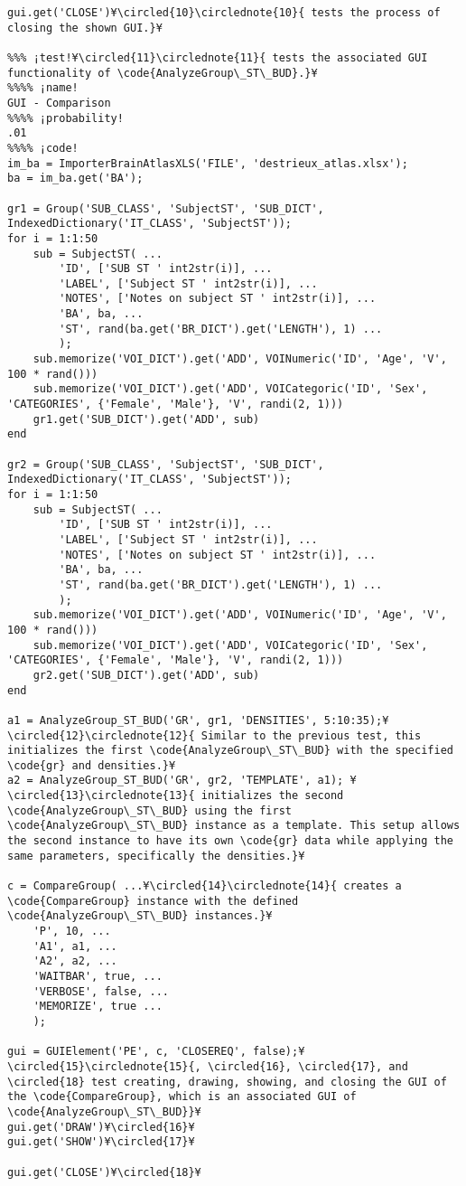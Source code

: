 \documentclass{tufte-handout}
\begin{document}
\begin{lstlisting}
gui.get('CLOSE')¥\circled{10}\circlednote{10}{ tests the process of closing the shown GUI.}¥

%%% ¡test!¥\circled{11}\circlednote{11}{ tests the associated GUI functionality of \code{AnalyzeGroup\_ST\_BUD}.}¥
%%%% ¡name!
GUI - Comparison
%%%% ¡probability!
.01
%%%% ¡code!
im_ba = ImporterBrainAtlasXLS('FILE', 'destrieux_atlas.xlsx');
ba = im_ba.get('BA');

gr1 = Group('SUB_CLASS', 'SubjectST', 'SUB_DICT', IndexedDictionary('IT_CLASS', 'SubjectST'));
for i = 1:1:50
    sub = SubjectST( ...
        'ID', ['SUB ST ' int2str(i)], ...
        'LABEL', ['Subject ST ' int2str(i)], ...
        'NOTES', ['Notes on subject ST ' int2str(i)], ...
        'BA', ba, ...
        'ST', rand(ba.get('BR_DICT').get('LENGTH'), 1) ...
        );
    sub.memorize('VOI_DICT').get('ADD', VOINumeric('ID', 'Age', 'V', 100 * rand()))
    sub.memorize('VOI_DICT').get('ADD', VOICategoric('ID', 'Sex', 'CATEGORIES', {'Female', 'Male'}, 'V', randi(2, 1)))
    gr1.get('SUB_DICT').get('ADD', sub)
end

gr2 = Group('SUB_CLASS', 'SubjectST', 'SUB_DICT', IndexedDictionary('IT_CLASS', 'SubjectST'));
for i = 1:1:50
    sub = SubjectST( ...
        'ID', ['SUB ST ' int2str(i)], ...
        'LABEL', ['Subject ST ' int2str(i)], ...
        'NOTES', ['Notes on subject ST ' int2str(i)], ...
        'BA', ba, ...
        'ST', rand(ba.get('BR_DICT').get('LENGTH'), 1) ...
        );
    sub.memorize('VOI_DICT').get('ADD', VOINumeric('ID', 'Age', 'V', 100 * rand()))
    sub.memorize('VOI_DICT').get('ADD', VOICategoric('ID', 'Sex', 'CATEGORIES', {'Female', 'Male'}, 'V', randi(2, 1)))
    gr2.get('SUB_DICT').get('ADD', sub)
end

a1 = AnalyzeGroup_ST_BUD('GR', gr1, 'DENSITIES', 5:10:35);¥\circled{12}\circlednote{12}{ Similar to the previous test, this initializes the first \code{AnalyzeGroup\_ST\_BUD} with the specified \code{gr} and densities.}¥
a2 = AnalyzeGroup_ST_BUD('GR', gr2, 'TEMPLATE', a1); ¥\circled{13}\circlednote{13}{ initializes the second \code{AnalyzeGroup\_ST\_BUD} using the first \code{AnalyzeGroup\_ST\_BUD} instance as a template. This setup allows the second instance to have its own \code{gr} data while applying the same parameters, specifically the densities.}¥

c = CompareGroup( ...¥\circled{14}\circlednote{14}{ creates a \code{CompareGroup} instance with the defined \code{AnalyzeGroup\_ST\_BUD} instances.}¥
    'P', 10, ...
    'A1', a1, ...
    'A2', a2, ...
    'WAITBAR', true, ...
    'VERBOSE', false, ...
    'MEMORIZE', true ...
    );

gui = GUIElement('PE', c, 'CLOSEREQ', false);¥\circled{15}\circlednote{15}{, \circled{16}, \circled{17}, and \circled{18} test creating, drawing, showing, and closing the GUI of the \code{CompareGroup}, which is an associated GUI of \code{AnalyzeGroup\_ST\_BUD}}¥
gui.get('DRAW')¥\circled{16}¥
gui.get('SHOW')¥\circled{17}¥

gui.get('CLOSE')¥\circled{18}¥

\end{lstlisting}
\end{document}

